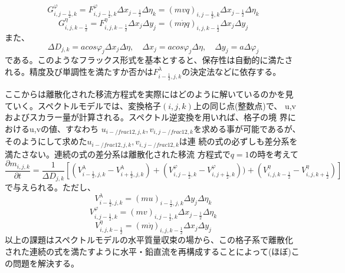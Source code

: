 \documentclass{jsbook}
\begin{document}
\begin{equation}
  G^{\varphi}_{i,j-\frac{1}{2},k}=F^{\varphi}_{i,j-\frac{1}{2},k} \Delta x_{j-\frac{1}{2}} \Delta \eta_{k}=(mvq)_{i,j-\frac{1}{2},k} \Delta x_{j-\frac{1}{2}} \Delta \eta_{k}
\end{equation}
\begin{equation}
  G^{\eta}_{i,j,k-\frac{1}{2}}=F^{\eta}_{i,j,k-\frac{1}{2}} \Delta x_{j} \Delta y_{j}=(m \dot{\eta} q)_{i,j,k-\frac{1}{2}} \Delta x_{j} \Delta y_{j}
\end{equation}
また、
\begin{equation}
  \Delta D_{j,k}=a cos \varphi_{j} \Delta x_{j} \Delta \eta,\quad \Delta x_{j}=a cos \varphi_{j} \Delta \eta,\quad \Delta y_{j}=a \Delta \varphi_{j}
\end{equation}
である。このようなフラックス形式を基本とすると、保存性は自動的に満たさ
れる。精度及び単調性を満たすか否かは$F^{\lambda}_{i-\frac{1}{2},j,k}$の決定法などに依存する。

ここからは離散化された移流方程式を実際にはどのように解いているのかを見
ていく。スペクトルモデルでは、変換格子$(i,j,k)$上の同じ点(整数点)で、
u,vおよびスカラー量が計算される。スペクトル逆変換を用いれば、格子の境
界におけるu,vの値、すなわち
$u_{i-/frac{1}{2},j,k},v_{i,j-/frac{1}{2},k}$を求める事が可能であるが、
そのようにして求めた$u_{i-/frac{1}{2},j,k},v_{i,j-/frac{1}{2},k}$は連
続の式の必ずしも差分系を満たさない。連続の式の差分系は離散化された移流
方程式で$q=1$の時を考えて
\begin{equation}
  \frac{\partial m_{i,j,k} }{\partial t}=\frac{1}{\Delta D_{j,k}}[(V^{\lambda}_{i-\frac{1}{2},j,k}-V^{\lambda}_{i+\frac{1}{2},j,k})+(V^{\varphi}_{i,j-\frac{1}{2},k}-V^{\varphi}_{i,j+\frac{1}{2},k}))+(V^{\eta}_{i,j,k-\frac{1}{2}}-V^{\eta}_{i,j,k+\frac{1}{2}})]
\end{equation}
で与えられる。ただし、
\begin{equation}
  V^{\lambda}_{i-\frac{1}{2},j,k}=(mu)_{i-\frac{1}{2},j,k} \Delta y_{j} \Delta \eta_{k}
\end{equation}
\begin{equation}
  V^{\varphi}_{i,j-\frac{1}{2},k}=(mv)_{i,j-\frac{1}{2},k} \Delta x_{j-\frac{1}{2}} \Delta \eta_{k}
\end{equation}
\begin{equation}
  V^{\eta}_{i,j,k-\frac{1}{2}}=(m\dot{\eta})_{i,j,k-\frac{1}{2}} \Delta x_{j} \Delta y_{j}
\end{equation}
以上の課題はスペクトルモデルの水平質量収束の場から、この格子系で離散化
された連続の式を満たすように水平・鉛直流を再構成することによって(ほぼ)この問題を解決する。
\end{document}
